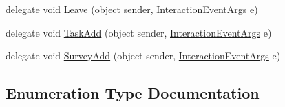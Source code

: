 \begin{DoxyCompactItemize}
\item 
delegate void \hyperlink{namespace_plex_byte_1_1_mo_cap_1_1_interactions_a5781fa40219fb39dbb38d341dc2a988a}{Leave} (object sender, \hyperlink{class_plex_byte_1_1_mo_cap_1_1_interactions_1_1_interaction_event_args}{Interaction\+Event\+Args} e)
\item 
delegate void \hyperlink{namespace_plex_byte_1_1_mo_cap_1_1_interactions_a15d0878ea4e4b99061b0424143eb2ce5}{Task\+Add} (object sender, \hyperlink{class_plex_byte_1_1_mo_cap_1_1_interactions_1_1_interaction_event_args}{Interaction\+Event\+Args} e)
\item 
delegate void \hyperlink{namespace_plex_byte_1_1_mo_cap_1_1_interactions_a1900501fc00150a42afd117937b7e88e}{Survey\+Add} (object sender, \hyperlink{class_plex_byte_1_1_mo_cap_1_1_interactions_1_1_interaction_event_args}{Interaction\+Event\+Args} e)
\end{DoxyCompactItemize}


\subsection{Enumeration Type Documentation}
